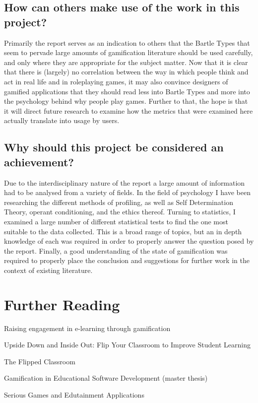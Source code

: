 \documentclass[12pt,a4paper,twoside]{report}
\begin{document}
\section{How can others make use of the work in this project?}
Primarily the report serves as an indication to others that the Bartle Types that seem to pervade large amounts of gamification literature should be used carefully, and only where they are appropriate for the subject matter. Now that it is clear that there is (largely) no correlation between the way in which people think and act in real life and in roleplaying games, it may also convince designers of gamified applications that they should read less into Bartle Types and more into the psychology behind why people play games. Further to that, the hope is that it will direct future research to examine how the metrics that were examined here actually translate into usage by users.

\section{Why should this project be considered an achievement?}
Due to the interdisciplinary nature of the report a large amount of information had to be analysed from a variety of fields. In the field of psychology I have been researching the different methods of profiling, as well as Self Determination Theory, operant conditioning, and the ethics thereof. Turning to statistics, I examined a large number of different statistical tests to find the one most suitable to the data collected. This is a broad range of topics, but an in depth knowledge of each was required in order to properly answer the question posed by the report. Finally, a good understanding of the state of gamification was required to properly place the conclusion and suggestions for further work in the context of existing literature.

\chapter{Further Reading}

Raising engagement in e-learning through gamification

Upside Down and Inside Out: Flip Your Classroom to Improve Student Learning

The Flipped Classroom

Gamification in Educational Software Development (master thesis)

Serious Games and Edutainment Applications
\end{document}
